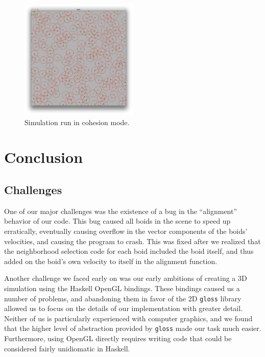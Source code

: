     \begin{figure}
        \centering
        \includegraphics[width=0.5\textwidth]{assets/img/cohesion}
        \caption{Simulation run in cohesion mode.}
        \label{fig:cohesion}
    \end{figure}
    \FloatBarrier
\section{Conclusion}
    \subsection{Challenges}
    One of our major challenges was the existence of a bug in the ``alignment'' behavior of our code. This bug caused all boids in the scene to speed up erratically, eventually causing overflow in the vector components of the boids' velocities, and causing the program to crash. This was fixed after we realized that the neighborhood selection code for each boid included the boid itself, and thus added on the boid's own velocity to itself in the alignment function.
    \par Another challenge we faced early on was our early ambitions of creating a 3D simulation using the Haskell OpenGL bindings. These bindings caused us a number of problems, and abandoning them in favor of the 2D \texttt{gloss} library allowed us to focus on the details of our implementation with greater detail. Neither of us is particularly experienced with computer graphics, and we found that the higher level of abstraction provided by \texttt{gloss} made our task much easier. Furthermore, using OpenGL directly requires writing code that could be considered fairly unidiomatic in Haskell.
    
